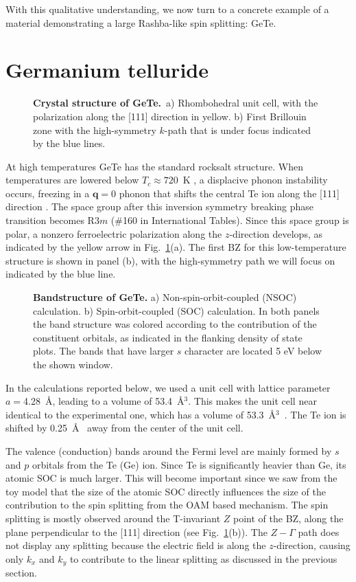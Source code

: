 With this qualitative understanding, we now turn to a concrete example of a material demonstrating a large Rashba-like spin splitting: GeTe.

\section{Germanium telluride}
\begin{figure}[h]
\caption{\label{fig:Rashba_crystal}{\bf Crystal structure of GeTe.}~a) Rhombohedral unit cell, with the polarization along the [111] direction in yellow. b) First Brillouin zone with the high-symmetry $k$-path that is under focus indicated by the blue lines.}
\end{figure}
At high temperatures GeTe has the standard rocksalt structure.
When temperatures are lowered below $T_c \approx 720$~K \cite{DiSante2013}, a displacive phonon instability occurs, freezing in a $\bm{q} = 0$ phonon that shifts the central Te ion along the [111] direction \cite{Rabe1987}.
The space group after this inversion symmetry breaking phase transition becomes R$3m$ (\#160 in International Tables).
Since this space group is polar, a nonzero ferroelectric polarization along the $z$-direction develops, as indicated by the yellow arrow in Fig.~\ref{fig:Rashba_crystal}(a).
The first BZ for this low-temperature structure is shown in panel (b), with the high-symmetry path we will focus on indicated by the blue line.

\begin{figure}[h!]
\caption{\label{fig:Rashba_bands_dos}{\bf Bandstructure of GeTe.} a) Non-spin-orbit-coupled (NSOC) calculation. b) Spin-orbit-coupled (SOC) calculation. In both panels the band structure was colored according to the contribution of the constituent orbitals, as indicated in the flanking density of state plots. The bands that have larger $s$ character are located 5 eV below the shown window.}
\end{figure}
In the calculations reported below, we used a unit cell with lattice parameter $a=$4.28~\AA, leading to a volume of 53.4~\AA$^3$.
This makes the unit cell near identical to the experimental one, which has a volume of 53.3~\AA$^3$~\cite{Serebryanaya1995}.
The Te ion is shifted by 0.25~\AA~ away from the center of the unit cell.

The valence (conduction) bands around the Fermi level are mainly formed by $s$ and $p$ orbitals from the Te (Ge) ion.
Since Te is significantly heavier than Ge, its atomic SOC is much larger. This will become important since we saw from the toy model that the size of the atomic SOC directly influences the size of the contribution to the spin splitting from the OAM based mechanism.
The spin splitting is mostly observed around the T-invariant $Z$ point of the BZ, along the plane perpendicular to the [111] direction (see Fig.~\ref{fig:Rashba_crystal}(b)).
The $Z-\Gamma$ path does not display any splitting because the electric field is along the $z$-direction, causing only  $k_x$ and $k_y$ to contribute to the linear splitting as discussed in the previous section.

